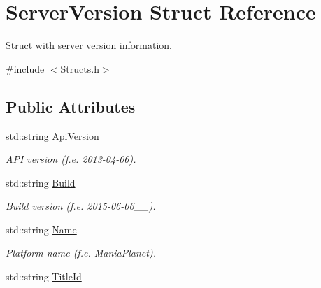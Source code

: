 \hypertarget{structServerVersion}{\section{Server\-Version Struct Reference}
\label{structServerVersion}
}


Struct with server version information.  




{\ttfamily \#include $<$Structs.\-h$>$}

\subsection*{Public Attributes}
\begin{DoxyCompactItemize}
\item 
\hypertarget{structServerVersion_a14472c8764f169f51a39b8c79cb7f029}{std\-::string \hyperlink{structServerVersion_a14472c8764f169f51a39b8c79cb7f029}{Api\-Version}}\label{structServerVersion_a14472c8764f169f51a39b8c79cb7f029}

\begin{DoxyCompactList}\small\item\em A\-P\-I version (f.\-e. 2013-\/04-\/06). \end{DoxyCompactList}\item 
\hypertarget{structServerVersion_a5b25dd32cdf460150f7e64cd17f4464b}{std\-::string \hyperlink{structServerVersion_a5b25dd32cdf460150f7e64cd17f4464b}{Build}}\label{structServerVersion_a5b25dd32cdf460150f7e64cd17f4464b}

\begin{DoxyCompactList}\small\item\em Build version (f.\-e. 2015-\/06-\/06\-\_\-\_). \end{DoxyCompactList}\item 
\hypertarget{structServerVersion_aadf5d3affd53da46d030cf1a4bc63353}{std\-::string \hyperlink{structServerVersion_aadf5d3affd53da46d030cf1a4bc63353}{Name}}\label{structServerVersion_aadf5d3affd53da46d030cf1a4bc63353}

\begin{DoxyCompactList}\small\item\em Platform name (f.\-e. Mania\-Planet). \end{DoxyCompactList}\item 
\hypertarget{structServerVersion_ac3bb8bad4747aa0272f1d16be6fb96bd}{std\-::string \hyperlink{structServerVersion_ac3bb8bad4747aa0272f1d16be6fb96bd}{Title\-Id}}\label{structServerVersion_ac3bb8bad4747aa0272f1d16be6fb96bd}


\end{DoxyCompactItemize}
